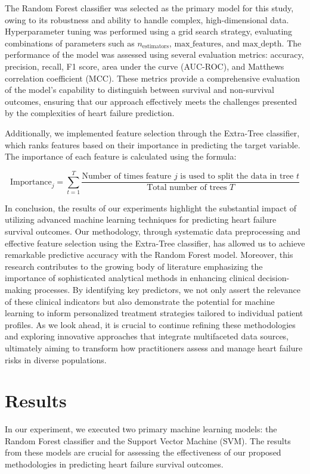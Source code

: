 \documentclass{article}
\begin{document}
The Random Forest classifier was selected as the primary model for this study, owing to its robustness and ability to handle complex, high-dimensional data. Hyperparameter tuning was performed using a grid search strategy, evaluating combinations of parameters such as \( n_{\text{estimators}} \), \( \text{max\_features} \), and \( \text{max\_depth} \). The performance of the model was assessed using several evaluation metrics: accuracy, precision, recall, F1 score, area under the curve (AUC-ROC), and Matthews correlation coefficient (MCC). These metrics provide a comprehensive evaluation of the model's capability to distinguish between survival and non-survival outcomes, ensuring that our approach effectively meets the challenges presented by the complexities of heart failure prediction.

Additionally, we implemented feature selection through the Extra-Tree classifier, which ranks features based on their importance in predicting the target variable. The importance of each feature is calculated using the formula:

\[
\text{Importance}_j = \sum_{t=1}^{T} \frac{\text{Number of times feature } j \text{ is used to split the data in tree } t}{\text{Total number of trees } T}
\]

In conclusion, the results of our experiments highlight the substantial impact of utilizing advanced machine learning techniques for predicting heart failure survival outcomes. Our methodology, through systematic data preprocessing and effective feature selection using the Extra-Tree classifier, has allowed us to achieve remarkable predictive accuracy with the Random Forest model. Moreover, this research contributes to the growing body of literature emphasizing the importance of sophisticated analytical methods in enhancing clinical decision-making processes. By identifying key predictors, we not only assert the relevance of these clinical indicators but also demonstrate the potential for machine learning to inform personalized treatment strategies tailored to individual patient profiles. As we look ahead, it is crucial to continue refining these methodologies and exploring innovative approaches that integrate multifaceted data sources, ultimately aiming to transform how practitioners assess and manage heart failure risks in diverse populations.

\section{Results}
In our experiment, we executed two primary machine learning models: the Random Forest classifier and the Support Vector Machine (SVM). The results from these models are crucial for assessing the effectiveness of our proposed methodologies in predicting heart failure survival outcomes.
\end{document}
